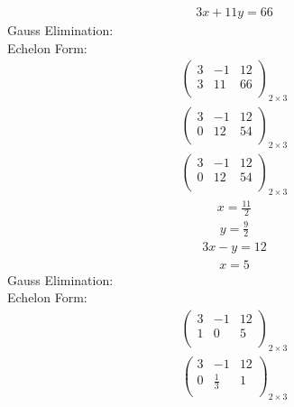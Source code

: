 \documentclass{article}
\begin{document}
\begin{align*}
3x + 11y=66\end{align*}
Gauss Elimination:\\
Echelon Form:\\
\begin{align*}
\left(
\begin{array}{cc|c}
3 & -1 & 12\\
3 & 11 & 66\\
\end{array}
\right)_{2\times 3}
\end{align*}
\begin{align*}
\left(
\begin{array}{cc|c}
3 & -1 & 12\\
0 & 12 & 54\\
\end{array}
\right)_{2\times 3}
\end{align*}
\begin{align*}
\left(
\begin{array}{cc|c}
3 & -1 & 12\\
0 & 12 & 54\\
\end{array}
\right)_{2\times 3}
\end{align*}
\begin{align*}
x=\frac{11}{2}\end{align*}
\begin{align*}
y=\frac{9}{2}\end{align*}
\begin{align*}
3x - y=12\end{align*}
\begin{align*}
x=5\end{align*}
Gauss Elimination:\\
Echelon Form:\\
\begin{align*}
\left(
\begin{array}{cc|c}
3 & -1 & 12\\
1 & 0 & 5\\
\end{array}
\right)_{2\times 3}
\end{align*}
\begin{align*}
\left(
\begin{array}{cc|c}
3 & -1 & 12\\
0 & \frac{1}{3} & 1\\
\end{array}
\right)_{2\times 3}
\end{align*}
\end{document}
